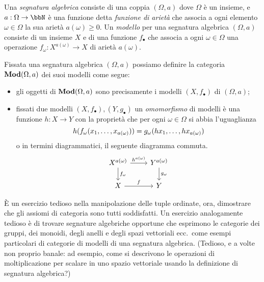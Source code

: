 \begin{example}\label{ex_cat_sigma_strutture}
	Una \emph{segnatura algebrica} consiste di una coppia \((\Omega, a)\) dove \(\Omega\) è un insieme, e \(a : \Omega \to \bbN\) è una funzione detta \emph{funzione di arietà} che associa a ogni elemento \(\omega \in \Omega\) la sua arietà \(a(\omega)\ge 0\). Un \emph{modello} per una segnatura algebrica \((\Omega,a)\) consiste di un insieme \(X\) e di una funzione \(f_\bullet\) che associa a ogni \(\omega\in\Omega\) una operazione \(f_\omega : X^{a(\omega)} \to X\) di arietà \(a(\omega)\).

	Fissata una segnatura algebrica \((\Omega,a)\) possiamo definire la categoria \(\mathbf{Mod}(\Omega,a)\) dei suoi modelli come segue:
	\begin{itemize}
		\item gli oggetti di \(\mathbf{Mod}(\Omega,a)\) sono precisamente i modelli \((X,f_\bullet)\) di \((\Omega,a)\);
		\item fissati due modelli \((X,f_\bullet), (Y,g_\bullet)\) un \emph{omomorfismo} di modelli è una funzione \(h : X\to Y\) con la proprietà che per ogni \(\omega\in\Omega\) si abbia l'uguaglianza
		      \[h(f_\omega(\tup x{a(\omega)},)) = g_\omega(\tup {hx}{a(\omega)},)\]
		      o in termini diagrammatici, il seguente diagramma commuta.
		      \[
			      \begin{tikzcd}
				      X^{a(\omega)} \ar{r}{h^{a(\omega)}} \ar{d}{f_\omega} & Y^{a(\omega)} \ar{d}{g_\omega} \\
				      X \ar{r}{f} & Y
			      \end{tikzcd}
		      \]
	\end{itemize}
\end{example}
\`E un esercizio tedioso nella manipolazione delle tuple ordinate, ora, dimostrare che gli assiomi di categoria sono tutti soddisfatti. Un esercizio analogamente tedioso è di trovare segnature algebriche opportune che esprimono le categorie dei gruppi, dei monoidi, degli anelli e degli spazi vettoriali ecc.\ come esempi particolari di categorie di modelli di una segnatura algebrica. (Tedioso, e a volte non proprio banale: ad esempio, come si descrivono le operazioni di moltiplicazione per scalare in uno spazio vettoriale usando la definizione di segnatura algebrica?)
